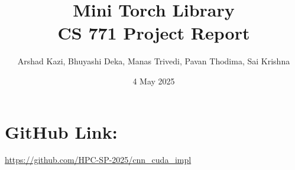 \documentclass{article}
\title{Mini Torch Library\\CS 771 Project Report}
\author{Arshad Kazi, Bhuyashi Deka, Manas Trivedi, Pavan Thodima, Sai Krishna}
\date{4 May 2025}
\begin{document}
\maketitle

\section*{GitHub Link:} \url{https://github.com/HPC-SP-2025/cnn_cuda_impl}










\end{document}
